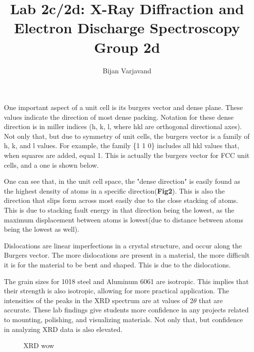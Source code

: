 \documentclass{article}
\author{Bijan Varjavand}
\title{Lab 2c/2d: X-Ray Diffraction and Electron Discharge Spectroscopy\\Group 2d}
\begin{document}
\maketitle

\clearpage

One important aspect of a unit cell is its burgers vector and dense plane. These values indicate the direction of most dense packing. Notation for these dense direction is in miller indices (h, k, l, where hkl are orthogonal directional axes). Not only that, but due to symmetry of unit cells, the burgers vector is a family of h, k, and l values. For example, the family \{1 1 0\} includes all hkl values that, when squares are added, equal 1. This is actually the burgers vector for FCC unit cells, and a one is shown below.

One can see that, in the unit cell space, the "dense direction" is easily found as the highest density of atoms in a specific direction(\textbf{Fig2}). This is also the direction that slips form across most easily due to the close stacking of atoms. This is due to stacking fault energy in that direction being the lowest, as the maximum displacement between atoms is lowest(due to distance between atoms being the lowest as well).

Dislocations are linear imperfections in a crystal structure, and occur along the Burgers vector. The more dislocations are present in a material, the more difficult it is for the material to be bent and shaped. This is due to the dislocations.

The grain sizes for 1018 steel and Aluminum 6061 are isotropic. This implies that their strength is also isotropic, allowing for more practical application. The intensities of the peaks in the XRD spectrum are at values of 2$\theta$ that are accurate. These lab findings give students more confidence in any projects related to mounting, polishing, and visualizing materials. Not only that, but confidence in analyzing XRD data is also elevated.

\clearpage

\begin{figure}
	\centering
	\caption{XRD wow}
\end{figure}
\end{document}
